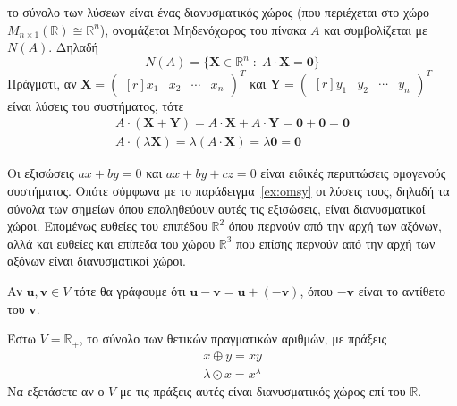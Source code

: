 \begin{example}
  το σύνολο των λύσεων είναι ένας διανυσματικός χώρος 
  (που περιέχεται στο χώρο $ M_{n \times 1}(\mathbb{R}) \cong 
  \mathbb{R}^{n} $), ονομάζεται \textcolor{Col2}{Μηδενόχωρος} του πίνακα 
  $A$ και συμβολίζεται με $ N(A) $. Δηλαδή
  \[
    N(A) = \{ \mathbf{X} \in \mathbb{R}^{n} \; : \; A \cdot \mathbf{X} = 
    \mathbf{0} \}  
  \] 
  Πράγματι, αν $ \mathbf{X} =\begin{pmatrix*}[r]
    x_{1} & x_{2} & \cdots & x_{n} 
    \end{pmatrix*}^{T} $ και $ \mathbf{Y} = \begin{pmatrix*}[r]
    y_{1} & y_{2} & \cdots & y_{n} 
  \end{pmatrix*}^{T} $ είναι λύσεις του συστήματος, τότε
  \begin{gather*}
    A \cdot (\mathbf{X}+\mathbf{Y}) = A \cdot \mathbf{X} + A 
    \cdot \mathbf{Y} = \mathbf{0}+ \mathbf{0} = \mathbf{0} \\
    A \cdot (\lambda \mathbf{X}) = \lambda (A \cdot \mathbf{X}) = 
    \lambda \mathbf{0} = \mathbf{0}
  \end{gather*} 
\end{example}

\begin{rem}\label{rem:lines}
  Οι εξισώσεις $ ax + by = 0 $ και $ ax + by + cz = 0 $ είναι ειδικές 
  περιπτώσεις ομογενούς συστήματος. Οπότε σύμφωνα με το παράδειγμα~\ref{ex:omsy} 
  οι λύσεις τους, δηλαδή τα σύνολα των σημείων όπου επαληθεύουν αυτές τις εξισώσεις, 
  είναι διανυσματικοί χώροι. Επομένως ευθείες του επιπέδου $ \mathbb{R}^{2} $ 
  όπου περνούν από την αρχή των αξόνων, αλλά και ευθείες και επίπεδα του χώρου 
  $ \mathbb{R}^{3} $ που επίσης περνούν από την αρχή των αξόνων είναι 
  διανυσματικοί χώροι.
\end{rem}

\begin{rem}
  Αν $ \mathbf{u}, \mathbf{v} \in V $ τότε θα γράφουμε ότι 
  $ \mathbf{u} - \mathbf{v} = \mathbf{u} + (- \mathbf{v}) $, 
  όπου $ - \mathbf{v} $ είναι το \textcolor{Col2}{αντίθετο} του $ \mathbf{v} $.
\end{rem}

\begin{exercise}
  Έστω $ V = \mathbb{R}_{+} $, το σύνολο των θετικών πραγματικών αριθμών, με 
  πράξεις
  \begin{gather*}
    x \oplus y = xy \\
    \lambda \odot x = x^{\lambda}
  \end{gather*} 
  Να εξετάσετε αν ο $V$ με τις πράξεις αυτές είναι διανυσματικός χώρος επί του 
  $ \mathbb{R} $.
\end{exercise}

